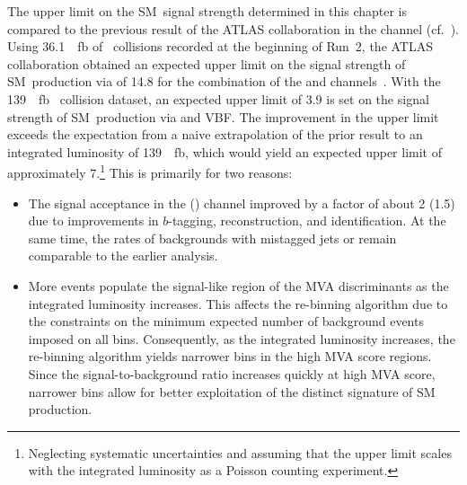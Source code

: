 The upper limit on the SM~\HH signal strength determined in this chapter is
compared to the previous result of the ATLAS collaboration in the \bbtautau
channel (cf.~). Using \SI{36.1}{\per\femto\barn}
of \pp~collisions recorded at the beginning of Run~2, the ATLAS collaboration
obtained an expected upper limit on the signal strength of SM~\HH production via
\ggF of 14.8 for the combination of the \lephad and \hadhad
channels~\cite{HIGG-2016-16-witherratum}. With the \SI{139}{\per\femto\barn}
\pp~collision dataset, an expected upper limit of 3.9 is set on the signal
strength of SM~\HH production via \ggF and VBF. The improvement in the upper
limit exceeds the expectation from a naive extrapolation of the prior result to
an integrated luminosity of \SI{139}{\per\femto\barn}, which would yield an
expected upper limit of approximately 7.\footnote{Neglecting systematic
  uncertainties and assuming that the upper limit scales with the integrated
  luminosity as a Poisson counting experiment.} This is primarily for two
reasons:
\begin{itemize}

\item The signal acceptance in the \hadhad (\lephad) channel improved by a
  factor of about 2 (1.5) due to improvements in $b$-tagging, \tauhadvis
  reconstruction, and \tauhadvis identification. At the same time, the rates of
  backgrounds with mistagged jets or \faketauhadvis remain comparable to the
  earlier analysis.

\item More events populate the signal-like region of the MVA discriminants as
  the integrated luminosity increases. This affects the re-binning algorithm due
  to the constraints on the minimum expected number of background events imposed
  on all bins. Consequently, as the integrated luminosity increases, the
  re-binning algorithm yields narrower bins in the high MVA score regions. Since
  the signal-to-background ratio increases quickly at high MVA score, narrower
  bins allow for better exploitation of the distinct signature of SM~\HH
  production.

\end{itemize}

